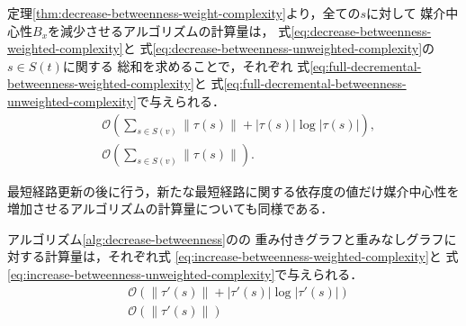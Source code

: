 定理\ref{thm:decrease-betweenness-weight-complexity}より，全ての$s$に対して
媒介中心性$B_x$を減少させるアルゴリズムの計算量は，
式\eqref{eq:decrease-betweenness-weighted-complexity}と
式\eqref{eq:decrease-betweenness-unweighted-complexity}の$s\in S(t)$に関する
総和を求めることで，それぞれ
式\eqref{eq:full-decremental-betweenness-weighted-complexity}と
式\eqref{eq:full-decremental-betweenness-unweighted-complexity}で与えられる．
\begin{align}
  &\mathcal{O}\left(\sum_{s\in S(v)}\|\tau(s)\|+|\tau(s)|\log|\tau(s)|\right),
  \label{eq:full-decremental-betweenness-weighted-complexity} \\
  &\mathcal{O}\left(\sum_{s\in S(v)}\|\tau(s)\|\right).
  \label{eq:full-decremental-betweenness-unweighted-complexity}
\end{align}

最短経路更新の後に行う，新たな最短経路に関する依存度の値だけ媒介中心性を
増加させるアルゴリズムの計算量についても同様である．

\begin{theorem}
  \label{thm:increase-betweenness-weight-complexity}
  アルゴリズム\ref{alg:decrease-betweenness}のの
  重み付きグラフと重みなしグラフに対する計算量は，それぞれ式
  \eqref{eq:increase-betweenness-weighted-complexity}と
  式\eqref{eq:increase-betweenness-unweighted-complexity}で与えられる．
  \begin{align}
    &\mathcal{O}\left(\|\tau'(s)\|+|\tau'(s)|\log|\tau'(s)|\right)
    \label{eq:increase-betweenness-weighted-complexity} \\
    &\mathcal{O}\left(\|\tau'(s)\|\right)
    \label{eq:increase-betweenness-unweighted-complexity}
  \end{align}
\end{theorem}

